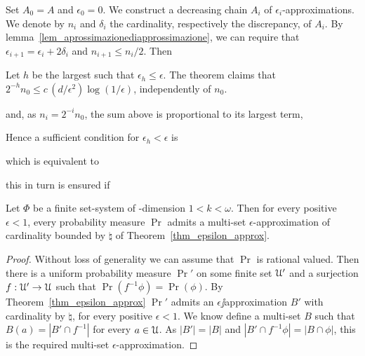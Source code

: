 \documentclass[sputnik.tex]{subfiles}
\begin{document}
\begin{void_thm}\rm
Set $A_0=A$ and $\epsilon_0=0$. We construct a decreasing chain $A_i$ of $\epsilon_i$-approximations.
We denote by $n_i$ and $\delta_i$ the cardinality, respectively the discrepancy, of $A_i$.
By lemma~\ref{lem_aprossimazionediapprossimazione}, we can require that $\epsilon_{i+1}=\epsilon_i+2\delta_i$ and $n_{i+1}\le n_i/2$.
Then


Let $h$ be the largest such that $\epsilon_h\le\epsilon$. The theorem claims that $\displaystyle 2^{-h}n_0\le c\,(d/\epsilon^2)\log(1/\epsilon)$, independently of $n_0$. 



and, as $n_i=2^{-i}n_0$, the sum above is proportional to its largest term,


Hence a sufficient condition for $\epsilon_h<\epsilon$ is 


which is equivalent to


this in turn is ensured if




\end{void_thm}


\begin{corollary}\label{coroll_epsilon_multiapprox}Let $\Phi$ be a finite set-system of \vc-dimension $1<k<\omega$.
Then for every positive $\epsilon<1$, every probability measure $\Pr$ admits a multi-set $\epsilon$-approximation of cardinality bounded by $\natural$ of Theorem~\ref{thm_epsilon_approx}.
\end{corollary}
\begin{proof}
Without loss of generality we can assume that $\Pr$ is rational valued.
Then there is a uniform probability measure $\Pr'$ on some finite set $\EuScript U'$ and a surjection $f:\EuScript U'\to\EuScript U$ such that $\Pr(f^{-1}\phi)=\Pr(\phi)$.
By Theorem~\ref{thm_epsilon_approx} $\Pr'$ admits an $\epsilon\jj$approximation $B'$ with cardinality by $\natural$, for every positive $\epsilon<1$.
We know define a multi-set $B$ such that $B(a)=|B'\cap f^{-1}|$ for every $a\in\EuScript U$.
As $|B'|=|B|$ and $|B'\cap f^{-1}\phi|=|B\cap\phi|$, this is the required multi-set $\epsilon$-approximation.
\end{proof}
\end{document}
